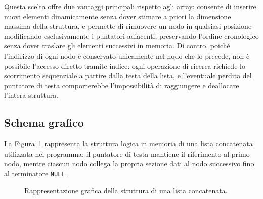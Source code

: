 \documentclass[11pt,a4paper,oneside,openany]{book}
\begin{document}
Questa scelta offre due vantaggi principali rispetto agli array: consente di inserire nuovi elementi dinamicamente senza dover stimare a priori la dimensione massima della struttura, e permette di rimuovere un nodo in qualsiasi posizione modificando esclusivamente i puntatori adiacenti, preservando l'ordine cronologico senza dover traslare gli elementi successivi in memoria. Di contro, poiché l'indirizzo di ogni nodo è conservato unicamente nel nodo che lo precede, non è possibile l'accesso diretto tramite indice: ogni operazione di ricerca richiede lo scorrimento sequenziale a partire dalla testa della lista, e l'eventuale perdita del puntatore di testa comporterebbe l'impossibilità di raggiungere e deallocare l'intera struttura.

\subsection{Schema grafico}
La Figura~\ref{fig:schema_lista} rappresenta la struttura logica in memoria di una lista concatenata utilizzata nel programma: il puntatore di testa mantiene il riferimento al primo nodo, mentre ciascun nodo collega la propria sezione dati al nodo successivo fino al terminatore \texttt{NULL}.

\begin{figure}[htbp]
\centering
{}
\caption{Rappresentazione grafica della struttura di una lista concatenata.}
\label{fig:schema_lista}
\end{figure}
\end{document}
